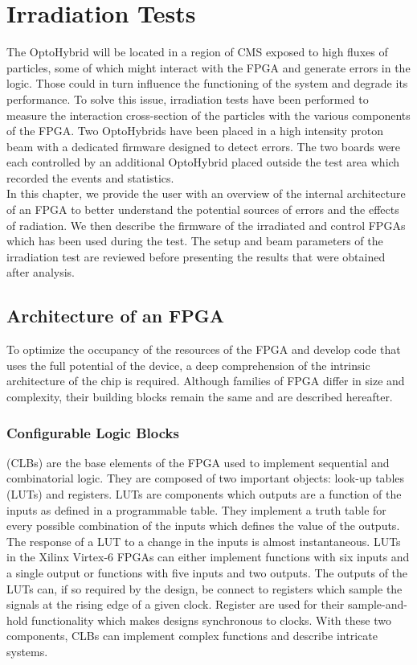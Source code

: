 \chapter{Irradiation Tests}
\label{chap:II-6-irradiation}

  The OptoHybrid will be located in a region of CMS exposed to high fluxes of particles, some of which might interact with the FPGA and generate errors in the logic. Those could in turn influence the functioning of the system and degrade its performance. To solve this issue, irradiation tests have been performed to measure the interaction cross-section of the particles with the various components of the FPGA. Two OptoHybrids have been placed in a high intensity proton beam with a dedicated firmware designed to detect errors. The two boards were each controlled by an additional OptoHybrid placed outside the test area which recorded the events and statistics. \\

  In this chapter, we provide the user with an overview of the internal architecture of an FPGA to better understand the potential sources of errors and the effects of radiation. We then describe the firmware of the irradiated and control FPGAs which has been used during the test. The setup and beam parameters of the irradiation test are reviewed before presenting the results that were obtained after analysis.

  \section{Architecture of an FPGA}

    To optimize the occupancy of the resources of the FPGA and develop code that uses the full potential of the device, a deep comprehension of the intrinsic architecture of the chip is required. Although families of FPGA differ in size and complexity, their building blocks remain the same and are described hereafter.

    \subsection{Configurable Logic Blocks}

      (CLBs) \cite{VIRTEX-CLB} are the base elements of the FPGA used to implement sequential and combinatorial logic. They are composed of two important objects: look-up tables (LUTs) and registers. LUTs are components which outputs are a function of the inputs as defined in a programmable table. They implement a truth table for every possible combination of the inputs which defines the value of the outputs. The response of a LUT to a change in the inputs is almost instantaneous. LUTs in the Xilinx Virtex-6 FPGAs can either implement functions with six inputs and a single output or functions with five inputs and two outputs. The outputs of the LUTs can, if so required by the design, be connect to registers which sample the signals at the rising edge of a given clock. Register are used for their sample-and-hold functionality which makes designs synchronous to clocks. With these two components, CLBs can implement complex functions and describe intricate systems. \\

